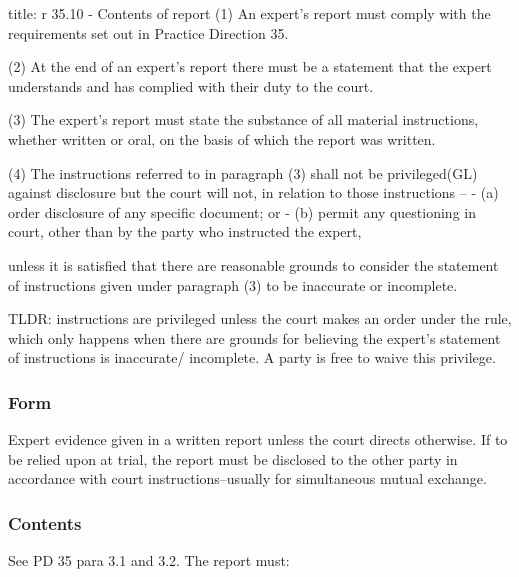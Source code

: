 \documentclass[
]{article}
\newenvironment{Shaded}{}{}
\newcommand{\NormalTok}[1]{#1}
\begin{document}
\begin{Shaded}
\begin{Highlighting}[]
\NormalTok{title: r 35.10 {-} Contents of report}
\NormalTok{(1) An expert’s report must comply with the requirements set out in Practice Direction 35.}

\NormalTok{(2) At the end of an expert’s report there must be a statement that the expert understands and has complied with their duty to the court.}

\NormalTok{(3) The expert’s report must state the substance of all material instructions, whether written or oral, on the basis of which the report was written.}

\NormalTok{(4) The instructions referred to in paragraph (3) shall not be privileged(GL) against disclosure but the court will not, in relation to those instructions –}
\NormalTok{{-} (a) order disclosure of any specific document; or}
\NormalTok{{-} (b) permit any questioning in court, other than by the party who instructed the expert,}

\NormalTok{unless it is satisfied that there are reasonable grounds to consider the statement of instructions given under paragraph (3) to be inaccurate or incomplete.}
\end{Highlighting}
\end{Shaded}

TLDR: instructions are privileged unless the court makes an order under
the rule, which only happens when there are grounds for believing the
expert's statement of instructions is inaccurate/ incomplete. A party is
free to waive this privilege.

\hypertarget{form}{%
\subsubsection{Form}\label{form}}

Expert evidence given in a written report unless the court directs
otherwise. If to be relied upon at trial, the report must be disclosed
to the other party in accordance with court instructions--usually for
simultaneous mutual exchange.

\hypertarget{contents}{%
\subsubsection{Contents}\label{contents}}

See PD 35 para 3.1 and 3.2. The report must:
\end{document}
